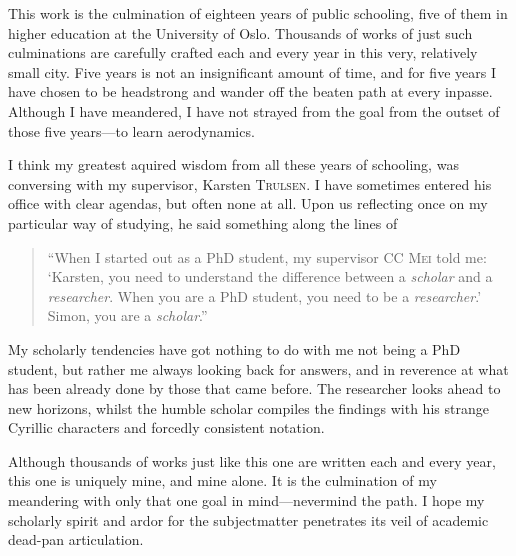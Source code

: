 This work is the culmination of eighteen years of public schooling, five of them in higher education at the University of Oslo.
Thousands of works of just such culminations are carefully crafted each and every year in this very, relatively small city.
Five years is not an insignificant amount of time, and for five years I have chosen to be headstrong and wander off the beaten path at every inpasse.
Although I have meandered, I have not strayed from the goal from the outset of those five years---to learn aerodynamics.

I think my greatest aquired wisdom from all these years of schooling, was conversing with my supervisor, Karsten \textsc{Trulsen}.
I have sometimes entered his office with clear agendas, but often none at all.
Upon us reflecting once on my particular way of studying, he said something along the lines of
\begin{quote}
  ``When I started out as a PhD student, my supervisor CC \textsc{Mei} told me: `Karsten, you need to understand the difference between a \emph{scholar} and a \emph{researcher}.
  When you are a PhD student, you need to be a \emph{researcher}.'
  Simon, you are a \emph{scholar}.''
\end{quote}
My scholarly tendencies have got nothing to do with me not being a PhD student, but rather me always looking back for answers, and in reverence at what has been already done by those that came before.
The researcher looks ahead to new horizons, whilst the humble scholar compiles the findings with his strange Cyrillic characters and forcedly consistent notation.

Although thousands of works just like this one are written each and every year, this one is uniquely mine, and mine alone.
It is the culmination of my meandering with only that one goal in mind---nevermind the path.
I hope my scholarly spirit and ardor for the subjectmatter penetrates its veil of academic dead-pan articulation.
